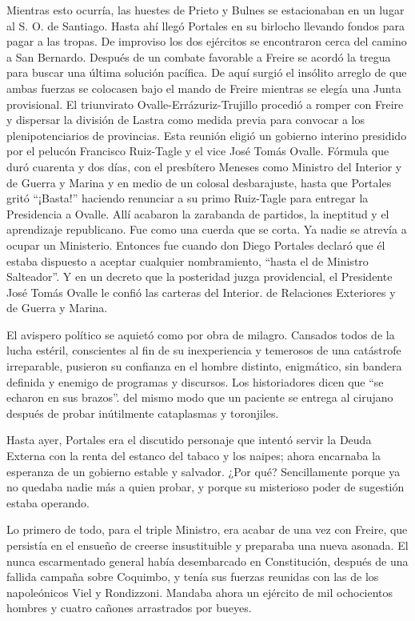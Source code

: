 \documentclass[10pt,twoside,openright]{memoir}
\begin{document}
Mientras esto ocurría, las huestes de Prieto y Bulnes se estacionaban en
un lugar al S. O. de Santiago. Hasta ahí llegó Portales en su birlocho
llevando fondos para pagar a las tropas. De improviso los dos ejércitos
se encontraron cerca del camino a San Bernardo. Después de un combate
favorable a Freire se acordó la tregua para buscar una última solución
pacífica. De aquí surgió el insólito arreglo de que
ambas fuerzas se colocasen bajo el mando de Freire mientras se elegía
una Junta provisional. El triunvirato Ovalle-Errázuriz-Trujillo procedió
a romper con Freire y dispersar la división de Lastra como medida previa
para convocar a los plenipotenciarios de provincias. Esta reunión eligió
un gobierno interino presidido por el pelucón Francisco Ruiz-Tagle y
el vice José Tomás Ovalle. Fórmula que duró cuarenta y dos días, con el
presbítero Meneses como Ministro del Interior y de Guerra y Marina y en
medio de un colosal desbarajuste, hasta que Portales gritó ``¡Basta!''
haciendo renunciar a su primo Ruiz-Tagle para entregar la Presidencia a
Ovalle. Allí acabaron la zarabanda de
partidos, la ineptitud y el aprendizaje republicano. Fue como una cuerda
que se corta. Ya nadie se atrevía a ocupar un Ministerio. Entonces fue
cuando don Diego Portales declaró que él estaba dispuesto a aceptar
cualquier nombramiento, ``hasta el de Ministro Salteador''. Y en un
decreto que la posteridad juzga providencial, el Presidente José Tomás
Ovalle le confió las carteras del Interior. de Relaciones Exteriores y
de Guerra y Marina.

El avispero político se aquietó como por obra de milagro. Cansados todos
de la lucha estéril, conscientes al fin de su inexperiencia y temerosos
de una catástrofe irreparable, pusieron su confianza en el
hombre distinto, enigmático, sin
bandera definida y enemigo de programas y discursos. Los historiadores
dicen que ``se echaron en sus brazos''. del mismo modo que un paciente se
entrega al cirujano después de probar inútilmente cataplasmas y
toronjiles.

Hasta ayer, Portales era el discutido personaje que intentó servir la
Deuda Externa con la renta del estanco del tabaco y los naipes; ahora
encarnaba la esperanza de un gobierno estable y salvador. ¿Por qué?
Sencillamente porque ya no quedaba nadie más a quien probar, y porque su
misterioso poder de sugestión estaba operando.

Lo primero de todo, para el triple Ministro, era acabar de una vez con
Freire, que persistía en el ensueño
de creerse insustituible y preparaba una nueva asonada. El nunca
escarmentado general había desembarcado en Constitución, después de una
fallida campaña sobre Coquimbo, y tenía sus fuerzas reunidas con las de
los napoleónicos Viel y Rondizzoni. Mandaba ahora un ejército de mil
ochocientos hombres y cuatro cañones
arrastrados por bueyes.
\end{document}

